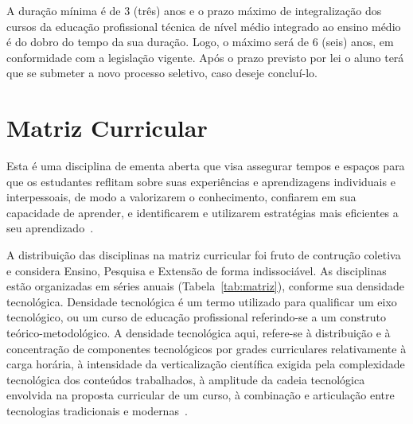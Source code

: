 \documentclass[11pt,fleqn]{book} %
\begin{document}
A duração mínima é de 3 (três) anos e o prazo máximo de integralização dos cursos da educação profissional técnica de nível médio integrado ao ensino médio é do dobro do tempo da sua duração. 
Logo, o máximo será de 6 (seis) anos, em conformidade com a legislação vigente. 
Após o prazo previsto por lei o aluno terá que se submeter a novo processo seletivo, caso deseje concluí-lo.


\section{Matriz Curricular}\label{matriz}
\indent

Esta é uma disciplina de ementa aberta que visa assegurar tempos e espaços para que os estudantes reflitam sobre suas experiências e aprendizagens individuais e interpessoais, de modo a valorizarem o conhecimento, confiarem em sua capacidade de aprender, e identificarem e utilizarem estratégias mais eficientes a seu aprendizado~\cite{BNCC2019}.


A distribuição das disciplinas na matriz curricular foi fruto de contrução coletiva e considera Ensino, Pesquisa e Extensão de forma indissociável.
As disciplinas estão organizadas em séries anuais (Tabela~\ref{tab:matriz}), conforme sua densidade tecnológica.
Densidade tecnológica é um termo utilizado para qualificar um eixo tecnológico, ou um curso de educação profissional referindo-se a um construto teórico-metodológico. 
A densidade tecnológica aqui, refere-se à distribuição e à concentração de componentes tecnológicos por grades curriculares relativamente à carga horária, à intensidade da verticalização científica exigida pela complexidade tecnológica dos conteúdos trabalhados, à amplitude da cadeia tecnológica envolvida na proposta curricular de um curso, à combinação e articulação entre tecnologias tradicionais e modernas~\cite{Machado2010}.
\end{document}
